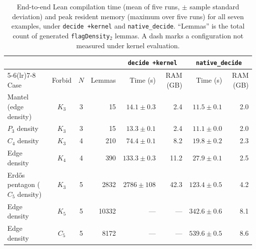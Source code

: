 \documentclass{article}
\newcommand{\lean}[1]{\texttt{#1}}
\begin{document}
\begin{table}[h]
  \centering
  \caption{End-to-end Lean compilation time (mean of five runs, $\pm$ sample
    standard deviation) and peak resident memory (maximum over five runs) for
    all seven examples, under \lean{decide +kernel} and \lean{native\_decide}.
    ``Lemmas'' is the total count of generated \lean{flagDensity}$_2$
    lemmas.  A dash marks a configuration not measured under kernel evaluation.}
  \label{tab:compile-times}
  \setlength{\tabcolsep}{4.5pt}
  \begin{tabular}{lccr rr rr}
    \toprule
    & & & & \multicolumn{2}{c}{\lean{decide +kernel}}
        & \multicolumn{2}{c}{\lean{native\_decide}} \\
    \cmidrule(lr){5-6}\cmidrule(lr){7-8}
    Case & Forbid & $N$ & Lemmas
      & Time (s) & RAM (GB) & Time (s) & RAM (GB) \\
    \midrule
    Mantel (edge density)              & $K_3$ & 3 &    15 & $14.1\pm0.3$   &  2.4 & $11.5\pm0.1$  & 2.0 \\
    $P_3$ density                      & $K_3$ & 3 &    15 & $13.3\pm0.1$   &  2.4 & $11.1\pm0.0$  & 2.0 \\
    $C_4$ density                      & $K_3$ & 4 &   210 & $74.4\pm0.1$   &  8.2 & $19.8\pm0.2$  & 2.3 \\
    Edge density                       & $K_4$ & 4 &   390 & $133.3\pm0.3$  & 11.2 & $27.9\pm0.1$  & 2.5 \\
    Erd\H{o}s pentagon ($C_5$ density) & $K_3$ & 5 &  2832 & $2786\pm108$   & 42.3 & $123.4\pm0.5$ & 4.2 \\
    Edge density                       & $K_5$ & 5 & 10332 & ---            & ---  & $342.6\pm0.6$ & 8.1 \\
    Edge density                       & $C_5$ & 5 &  8172 & ---            & ---  & $539.6\pm0.5$ & 8.6 \\
    \bottomrule
  \end{tabular}
\end{table}
\end{document}
